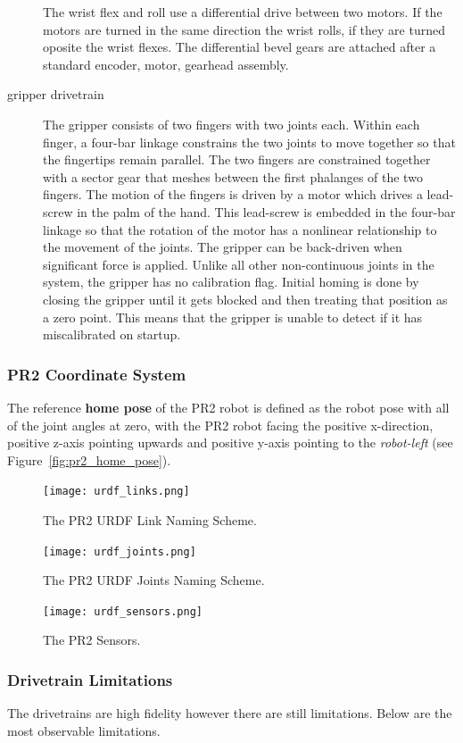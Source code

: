 \begin{description}
The wrist flex and roll use a differential drive between two motors.  If the motors
are turned in the same direction the wrist rolls, if they are turned
oposite the wrist flexes.  The differential bevel gears are attached
after a standard encoder, motor, gearhead assembly.


\item[gripper drivetrain]
The gripper consists of two fingers with two joints each.  Within each finger, a four-bar linkage constrains the two joints to move together so that the fingertips remain parallel.  The two fingers are constrained together with a sector gear that meshes between the first phalanges of the two fingers.  The motion of the fingers is driven by a motor which drives a lead-screw in the palm of the hand.  This lead-screw is embedded in the four-bar linkage so that the rotation of the motor has a nonlinear relationship to the movement of the joints.  The gripper can be back-driven when significant force is applied.  Unlike all other non-continuous joints in the system, the gripper has no calibration flag.  Initial homing is done by closing the gripper until it gets blocked and then treating that position as a zero point.  This means that the gripper is unable to detect if it has miscalibrated on startup.

\end{description}


\subsubsection{PR2 Coordinate System}
\label{sec:pr2_coordinate_system}
The reference {\bf home pose} of the PR2 robot is defined as the robot pose with all of the joint angles at zero,
with the PR2 robot facing the positive x-direction, positive z-axis pointing upwards and positive y-axis pointing to the {\it robot-left} (see Figure~\ref{fig:pr2_home_pose}).

\begin{figure}[!h]
\centering
\texttt{[image: urdf\_links.png]}
\caption{The PR2 URDF Link Naming Scheme.}
\label{fig:urdf_link_names}
\texttt{[image: urdf\_joints.png]}
\caption{The PR2 URDF Joints Naming Scheme.}
\label{fig:urdf_joints}
\texttt{[image: urdf\_sensors.png]}
\caption{The PR2 Sensors.}
\label{fig:urdf_sensor}
\end{figure}


\subsubsection{Drivetrain Limitations}
The drivetrains are high fidelity however there are still limitations.
Below are the most observable limitations.

